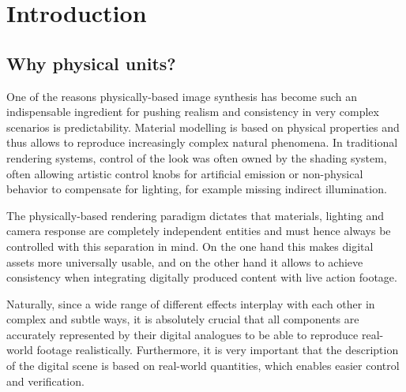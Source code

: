 
\chapter{Introduction}

\section{Why physical units?}

One of the reasons physically-based image synthesis has become such an
indispensable ingredient for pushing realism and consistency in very
complex scenarios is predictability. Material modelling is based on
physical properties and thus allows to reproduce increasingly complex
natural phenomena. In traditional rendering systems, control of the
look was often owned by the shading system, often allowing artistic
control knobs for artificial emission or non-physical behavior to
compensate for lighting, for example missing indirect illumination.

The physically-based rendering paradigm dictates that materials,
lighting and camera response are completely independent entities and
must hence always be controlled with this separation in mind. 
On the one hand this makes digital assets more universally usable, 
and on the other hand it allows to achieve consistency when integrating 
digitally produced content with live action \gls{footage}.

Naturally, since a wide range of different effects interplay with each
other in complex and subtle ways, it is absolutely crucial that all
components are accurately represented by their digital analogues to be
able to reproduce real-world footage realistically. Furthermore, it is
very important that the description of the \gls{digital scene} is based on
real-world quantities, which enables easier control and verification.

